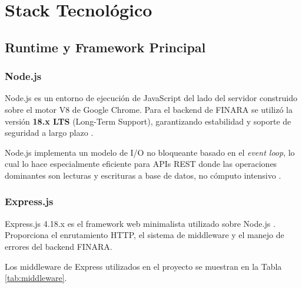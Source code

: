\chapter{Stack Tecnológico}

\section{Runtime y Framework Principal}

\subsection{Node.js}

Node.js es un entorno de ejecución de JavaScript del lado del servidor construido sobre el motor V8 de Google Chrome. Para el backend de FINARA se utilizó la versión \textbf{18.x LTS} (Long-Term Support), garantizando estabilidad y soporte de seguridad a largo plazo \cite{nodejs_docs}.

\begin{notaTecnica}
  Node.js implementa un modelo de I/O no bloqueante basado en el \textit{event loop}, lo cual lo hace especialmente eficiente para APIs REST donde las operaciones dominantes son lecturas y escrituras a base de datos, no cómputo intensivo \cite{nodejs_event_loop}.
\end{notaTecnica}

\subsection{Express.js}

Express.js 4.18.x es el framework web minimalista utilizado sobre Node.js \cite{express_docs}. Proporciona el enrutamiento HTTP, el sistema de middleware y el manejo de errores del backend FINARA.

Los middleware de Express utilizados en el proyecto se muestran en la Tabla \ref{tab:middleware}.

